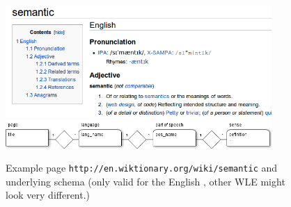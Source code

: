 \begin{figure}[htb]
\centering
\includegraphics[width=0.9\textwidth]{./images/example-page.png}
\vspace{0.3cm}
\hspace{0.1cm}
\includegraphics[width=0.9\textwidth]{./images/entrylayout.png}
\caption{Example page \texttt{http://en.wiktionary.org/wiki/semantic} and underlying schema (only valid for the English \wik, other WLE might look very different.)}
\label{fig:example}
\end{figure}

